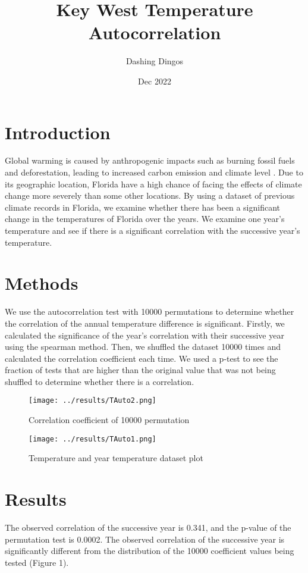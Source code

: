 \documentclass{article}
\title{Key West Temperature Autocorrelation}
\author{Dashing Dingos}
\date{Dec 2022}
\begin{document}
\section{Introduction}
Global warming is caused by anthropogenic impacts such as burning fossil fuels and deforestation, leading to increased carbon emission and climate level \cite{houghton2005global}.
Due to its geographic location, Florida have a high chance of facing the effects of climate change more severely than some other locations.
By using a dataset of previous climate records in Florida, we examine whether there has been a significant change in the temperatures of Florida over the years.
We examine one year's temperature and see if there is a significant correlation with the successive year's temperature.

\section{Methods}
We use the autocorrelation test with 10000 permutations to determine whether the correlation of the annual temperature difference is significant.
Firstly, we calculated the significance of the year's correlation with their successive year using the spearman method.
Then, we shuffled the dataset 10000 times and calculated the correlation coefficient each time.
We used a p-test to see the fraction of tests that are higher than the original value that was not being shuffled to determine whether there is a correlation.

\begin{figure}[H]
    \begin{center}
\centering
\texttt{[image: ../results/TAuto2.png]}
\caption{Correlation coefficient of 10000 permutation}
\end{center}
\end{figure}

\begin{figure}[H]
    \begin{center}
\centering
\texttt{[image: ../results/TAuto1.png]}
\caption{Temperature and year temperature dataset plot}
\end{center}
\end{figure}

\section{Results}
The observed correlation of the successive year is 0.341, and the p-value of the permutation test is 0.0002. 
The observed correlation of the successive year is significantly different from the distribution of the 10000 coefficient values being tested (Figure 1).
\end{document}
